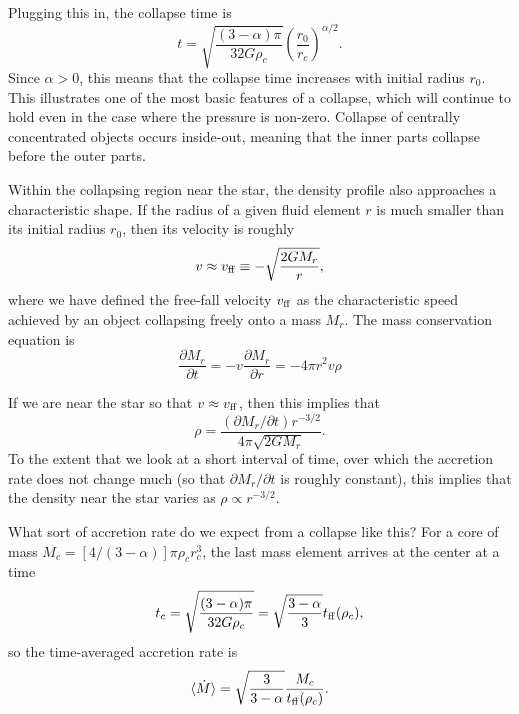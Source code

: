 Plugging this in, the collapse time is
\begin{equation}
t = \sqrt{\frac{(3-\alpha)\pi}{32 G \rho_c}} \left(\frac{r_0}{r_c}\right)^{\alpha/2}.
\end{equation}
Since $\alpha>0$, this means that the collapse time increases with initial radius $r_0$. This illustrates one of the most basic features of a collapse, which will continue to hold even in the case where the pressure is non-zero. Collapse of centrally concentrated objects occurs inside-out, meaning that the inner parts collapse before the outer parts.

Within the collapsing region near the star, the density profile also approaches a characteristic shape. If the radius of a given fluid element $r$ is much smaller than its initial radius $r_0$, then its velocity is roughly
\begin{equation}
v \approx v_{\rm ff}\equiv -\sqrt{\frac{2GM_r}{r}},
\end{equation}
where we have defined the free-fall velocity $v_{\rm ff}$ as the characteristic speed achieved by an object collapsing freely onto a mass $M_r$. The mass conservation equation is
\begin{equation}
\frac{\partial M_r}{\partial t} = -v\frac{\partial M_r}{\partial r}  = -4\pi r^2 v \rho
\end{equation}

If we are near the star so that $v\approx v_{\rm ff}$, then this implies that
\begin{equation}
\rho = \frac{(\partial M_r/\partial t) r^{-3/2}}{4\pi\sqrt{2 G M_r}}.
\end{equation}
To the extent that we look at a short interval of time, over which the accretion rate does not change much (so that $\partial M_r /\partial t$ is roughly constant), this implies that the density near the star varies as $\rho\propto r^{-3/2}$.

What sort of accretion rate do we expect from a collapse like this? For a core of mass $M_c = [4/(3-\alpha)]\pi \rho_c r_c^3$, the last mass element arrives at the center at a time
\begin{equation}
t_c = \sqrt{\frac{(3-\alpha)\pi}{32 G \rho_c}} = \sqrt{\frac{3-\alpha}{3}}t_{\rm ff}(\rho_c),
\end{equation}
so the time-averaged accretion rate is
\begin{equation}
\langle\dot{M}\rangle = \sqrt{\frac{3}{3-\alpha}} \frac{M_c}{t_{\rm ff}(\rho_c)}.
\end{equation}


